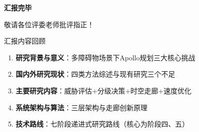\documentclass{beamer}
\begin{document}
\begin{frame}{}
  \centering
  \vspace{0.4em}
  {\huge\bfseries 汇报完毕}

  \vspace{0.6em}
  {\large 敬请各位评委老师批评指正！}

  \vspace{0.8em}
  \begin{block}{汇报内容回顾}
    \begin{enumerate}
      \item \textbf{研究背景与意义}：多障碍物场景下Apollo规划三大核心挑战
      \item \textbf{国内外研究现状}：四类方法综述与现有研究三个不足
      \item \textbf{主要研究内容}：威胁评估$+$分级决策$+$时空走廊$+$速度优化
      \item \textbf{系统架构与算法}：三层架构与走廊创新原理
      \item \textbf{技术路线}：七阶段递进式研究路线（核心为阶段四、五）
    \end{enumerate}
  \end{block}
\end{frame}
\end{document}

